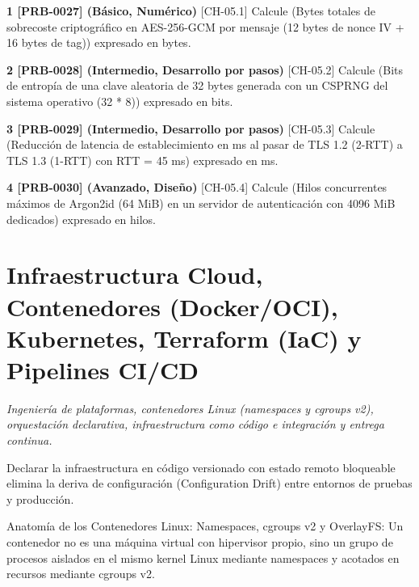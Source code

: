 \documentclass{book}
\begin{document}
\begin{tcolorbox}[title={Ejercicios}, studiumworked, breakable]

\noindent\textbf{1 [PRB-0027] (Básico, Numérico)}
[CH-05.1] Calcule (Bytes totales de sobrecoste criptográfico en AES-256-GCM por mensaje (12 bytes de nonce IV + 16 bytes de tag)) expresado en bytes.

\noindent\textbf{2 [PRB-0028] (Intermedio, Desarrollo por pasos)}
[CH-05.2] Calcule (Bits de entropía de una clave aleatoria de 32 bytes generada con un CSPRNG del sistema operativo (32 * 8)) expresado en bits.

\noindent\textbf{3 [PRB-0029] (Intermedio, Desarrollo por pasos)}
[CH-05.3] Calcule (Reducción de latencia de establecimiento en ms al pasar de TLS 1.2 (2-RTT) a TLS 1.3 (1-RTT) con RTT = 45 ms) expresado en ms.

\noindent\textbf{4 [PRB-0030] (Avanzado, Diseño)}
[CH-05.4] Calcule (Hilos concurrentes máximos de Argon2id (64 MiB) en un servidor de autenticación con 4096 MiB dedicados) expresado en hilos.
\end{tcolorbox}

\chapter{Infraestructura Cloud, Contenedores (Docker/OCI), Kubernetes, Terraform (IaC) y Pipelines CI/CD}
\label{chap:ch-06}

\noindent\textit{Ingeniería de plataformas, contenedores Linux (namespaces y cgroups v2), orquestación declarativa, infraestructura como código e integración y entrega continua.}

\begin{tcolorbox}[title={Consejo}, studiumtip, breakable]

Declarar la infraestructura en código versionado con estado remoto bloqueable elimina la deriva de configuración (Configuration Drift) entre entornos de pruebas y producción.
\end{tcolorbox}

\begin{tcolorbox}[title={Definición}, studiumdef, breakable]

Anatomía de los Contenedores Linux: Namespaces, cgroups v2 y OverlayFS: Un contenedor no es una máquina virtual con hipervisor propio, sino un grupo de procesos aislados en el mismo kernel Linux mediante namespaces y acotados en recursos mediante cgroups v2.
\end{tcolorbox}
\end{document}
